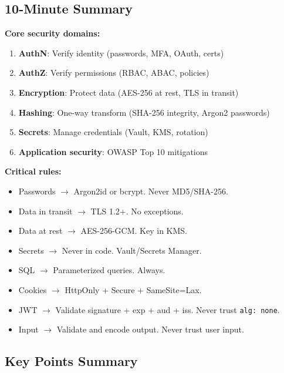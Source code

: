 \documentclass[11pt]{article}
\providecommand{\tightlist}{\setlength{\itemsep}{1pt}\setlength{\parskip}{0pt}}
\begin{document}
\subsection{10-Minute Summary}\label{10-minute-summary}

\textbf{Core security domains:}

\begin{enumerate}
\def\labelenumi{\arabic{enumi}.}
\tightlist
\item
  \textbf{AuthN}: Verify identity (passwords, MFA, OAuth, certs)
\item
  \textbf{AuthZ}: Verify permissions (RBAC, ABAC, policies)
\item
  \textbf{Encryption}: Protect data (AES-256 at rest, TLS in transit)
\item
  \textbf{Hashing}: One-way transform (SHA-256 integrity, Argon2 passwords)
\item
  \textbf{Secrets}: Manage credentials (Vault, KMS, rotation)
\item
  \textbf{Application security}: OWASP Top 10 mitigations
\end{enumerate}

\textbf{Critical rules:}

\begin{itemize}
\tightlist
\item
  Passwords \(\rightarrow\) Argon2id or bcrypt. Never MD5/SHA-256.
\item
  Data in transit \(\rightarrow\) TLS 1.2+. No exceptions.
\item
  Data at rest \(\rightarrow\) AES-256-GCM. Key in KMS.
\item
  Secrets \(\rightarrow\) Never in code. Vault/Secrets Manager.
\item
  SQL \(\rightarrow\) Parameterized queries. Always.
\item
  Cookies \(\rightarrow\) HttpOnly + Secure + SameSite=Lax.
\item
  JWT \(\rightarrow\) Validate signature + exp + aud + iss. Never trust \texttt{alg:\ none}.
\item
  Input \(\rightarrow\) Validate and encode output. Never trust user input.
\end{itemize}

\subsection{Key Points Summary}\label{key-points-summary}
\end{document}
